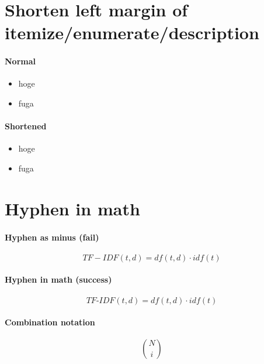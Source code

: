 \documentclass{article}
\begin{document}
\section{Shorten left margin of itemize/enumerate/description}

\paragraph{Normal}

\begin{itemize}
	\item hoge
	\item fuga
\end{itemize}

\paragraph{Shortened}

\begin{itemize}[leftmargin=*]
	\item hoge
	\item fuga
\end{itemize}


\section{Hyphen in math}

\paragraph{Hyphen as minus (fail)}

\[ TF-IDF(t, d) = df(t, d) \cdot idf(t) \]

\paragraph{Hyphen in math (success)}

\[ TF\mbox{-}IDF(t, d) = df(t, d) \cdot idf(t) \]


\paragraph{Combination notation}

\[ {{N}\choose{i}} \]
\end{document}
